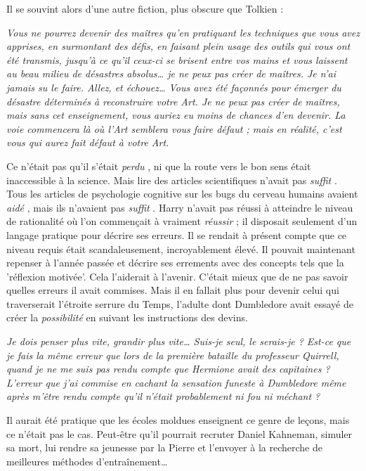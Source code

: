Il se souvint alors d'une autre fiction, plus obscure que Tolkien :

\emph{Vous ne pourrez devenir des maîtres qu'en pratiquant les techniques que vous avez apprises, en surmontant des défis, en faisant plein usage des outils qui vous ont été transmis, jusqu'à ce qu'il ceux-ci se brisent entre vos mains et vous laissent au beau milieu de désastres absolus… je ne peux pas créer de maîtres. Je n'ai jamais su le faire. Allez, et échouez… Vous avez été façonnés pour émerger du désastre déterminés à reconstruire votre Art. Je ne peux pas créer de maîtres, mais sans cet enseignement, vous auriez eu moins de chances d'en devenir. La voie commencera là où l'Art semblera vous faire défaut ; mais en réalité, c'est vous qui aurez fait défaut à votre Art.} 

Ce n'était pas qu'il s'était \emph{perdu} , ni que la route vers le bon sens était inaccessible à la science. Mais lire des articles scientifiques n'avait pas \emph{suffit} . Tous les articles de psychologie cognitive sur les bugs du cerveau humains avaient \emph{aidé} , mais ils n'avaient pas \emph{suffit} . Harry n'avait pas réussi à atteindre le niveau de rationalité où l'on commençait à vraiment \emph{réussir}  ; il disposait seulement d'un langage pratique pour décrire ses erreurs. Il se rendait à présent compte que ce niveau requis était scandaleusement, incroyablement élevé. Il pouvait maintenant repenser à l'année passée et décrire ses errements avec des concepts tels que la 'réflexion motivée'. Cela l'aiderait à l'avenir. C'était mieux que de ne pas savoir quelles erreurs il avait commises. Mais il en fallait plus pour devenir celui qui traverserait l'étroite serrure du Temps, l'adulte dont Dumbledore avait essayé de créer la \emph{possibilité}  en suivant les instructions des devins.

\emph{Je dois penser plus vite, grandir plus vite… Suis-je seul, le serais-je ? Est-ce que je fais la même erreur que lors de la première bataille du professeur Quirrell, quand je ne me suis pas rendu compte que Hermione avait des capitaines ? L'erreur que j'ai commise en cachant la sensation funeste à Dumbledore même après m'être rendu compte qu'il n'était probablement ni fou ni méchant ?} 

Il aurait été pratique que les écoles moldues enseignent ce genre de leçons, mais ce n'était pas le cas. Peut-être qu'il pourrait recruter Daniel Kahneman, simuler sa mort, lui rendre sa jeunesse par la Pierre et l'envoyer à la recherche de meilleures méthodes d'entraînement…

